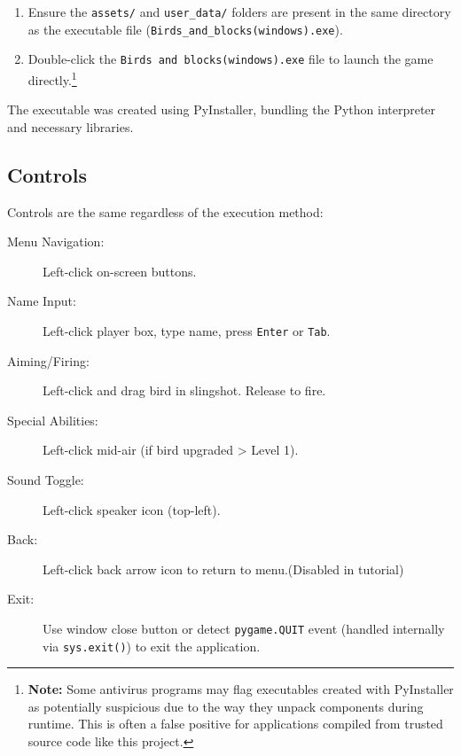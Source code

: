 \documentclass[11pt, a4paper]{article}
\begin{document}
\begin{enumerate}

    \item Ensure the \texttt{assets/} and \texttt{user\_data/} folders are present in the same directory as the executable file (\texttt{Birds\_and\_blocks(windows).exe}).
    
    \item Double-click the \texttt{Birds and blocks(windows).exe} file to launch the game directly.\footnote{\textbf{Note:} Some antivirus programs may flag executables created with PyInstaller as potentially suspicious due to the way they unpack components during runtime. This is often a false positive for applications compiled from trusted source code like this project.}

\end{enumerate}

The executable was created using PyInstaller, bundling the Python interpreter and necessary libraries.

\subsection{Controls}

Controls are the same regardless of the execution method:

\begin{description}

    \item[Menu Navigation:] Left-click on-screen buttons.
    
    \item[Name Input:] Left-click player box, type name, press \texttt{Enter} or \texttt{Tab}.
    
    \item[Aiming/Firing:] Left-click and drag bird in slingshot. Release to fire.
    
    \item[Special Abilities:] Left-click mid-air (if bird upgraded > Level 1).
    
    \item[Sound Toggle:] Left-click speaker icon (top-left).
    
    \item[Back:] Left-click back arrow icon to return to menu.(Disabled in tutorial)
    
    \item[Exit:] Use window close button or detect \texttt{pygame.QUIT} event (handled internally via \texttt{sys.exit()}) to exit the application.

\end{description}
\end{document}
